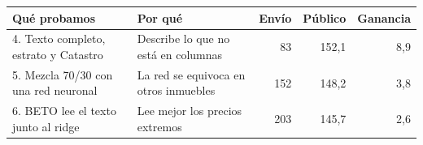 \begin{tabular}{llrrr}
\toprule
Qué probamos & Por qué & Envío & Público & Ganancia \\
\midrule
4. Texto completo, estrato y Catastro & Describe lo que no está en columnas & 83 & 152,1 & 8,9 \\
5. Mezcla 70/30 con una red neuronal & La red se equivoca en otros inmuebles & 152 & 148,2 & 3,8 \\
6. BETO lee el texto junto al ridge & Lee mejor los precios extremos & 203 & 145,7 & 2,6 \\
\bottomrule
\end{tabular}
